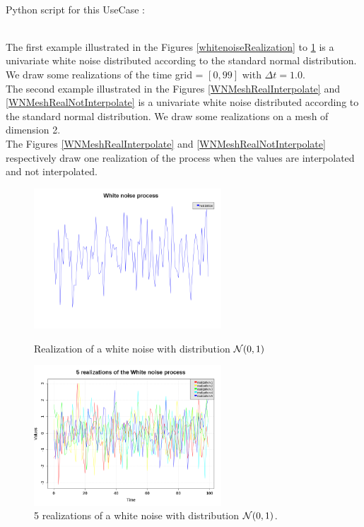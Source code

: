 \textspace\\
Python script for this UseCase :


\textspace\\

The first example illustrated in the  Figures \ref{whitenoiseRealization} to \ref{whitenoiseRealizations} is a univariate white noise distributed according to the standard normal distribution. We draw some realizations of the time grid = $[0,99]$ with $\Delta t = 1.0$.\\


The second example illustrated in the  Figures  \ref{WNMeshRealInterpolate} and \ref{WNMeshRealNotInterpolate} is a univariate white noise distributed according to the standard normal distribution.   We draw some realizations on a mesh of dimension 2.\\
The Figures \ref{WNMeshRealInterpolate} and \ref{WNMeshRealNotInterpolate} respectively draw   one realization  of the process when the values are interpolated and not interpolated.



\begin{figure}[H]
  \begin{minipage}{9cm}
    \begin{center}
      \includegraphics[width=7cm]{Figures/whitenoise_realization.png}
      \caption{Realization of a white noise with distribution ${\mathcal N}(0, 1)$}
      \label{whitenoiseRealization}
    \end{center}
  \end{minipage}
  \hfill
  \begin{minipage}{9cm}
    \begin{center}
      \includegraphics[width=7cm]{Figures/whitenoise_realizations.png}
      \caption{5 realizations of a white noise with distribution ${\mathcal N}(0, 1)$.}
      \label{whitenoiseRealizations}
    \end{center}
  \end{minipage}
\end{figure}



